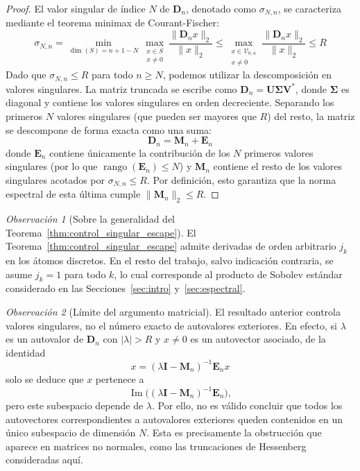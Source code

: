 \documentclass[12pt,a4paper]{article}
\theoremstyle{definition}
\theoremstyle{remark}
\newtheorem{remark}{Observación}
\begin{document}
\begin{proof}
  El valor singular de índice $N$ de $\mathbf{D}_n$, denotado como $\sigma_{N,n}$, se caracteriza mediante el teorema minimax de Courant-Fischer:
  \begin{equation}
    \sigma_{N,n} = \min_{\dim(S) = n+1-N} \max_{\substack{x \in S \\ x \neq 0}} \frac{\|\mathbf{D}_n x\|_2}{\|x\|_2} \le \max_{\substack{x \in \mathcal{V}_{0,n} \\ x \neq 0}} \frac{\|\mathbf{D}_n x\|_2}{\|x\|_2} \le R
  \end{equation}
  Dado que $\sigma_{N,n} \le R$ para todo $n \ge N$, podemos utilizar la descomposición en valores singulares. La matriz truncada se escribe como $\mathbf{D}_n = \mathbf{U} \mathbf{\Sigma} \mathbf{V}^*$, donde $\mathbf{\Sigma}$ es diagonal y contiene los valores singulares en orden decreciente.
  Separando los primeros $N$ valores singulares (que pueden ser mayores que $R$) del resto, la matriz se descompone de forma exacta como una suma:
  $$ \mathbf{D}_n = \mathbf{M}_n + \mathbf{E}_n $$
  donde $\mathbf{E}_n$ contiene únicamente la contribución de los $N$ primeros valores singulares (por lo que $\operatorname{rango}(\mathbf{E}_n) \le N$) y $\mathbf{M}_n$ contiene el resto de los valores singulares acotados por $\sigma_{N,n} \le R$. Por definición, esto garantiza que la norma espectral de esta última cumple $\|\mathbf{M}_n\|_2 \le R$.
\end{proof}

\begin{remark}[Sobre la generalidad del Teorema~\ref{thm:control_singular_escape}]
  El Teorema~\ref{thm:control_singular_escape} admite derivadas de orden arbitrario $j_k$ en los átomos discretos. En el resto del trabajo, salvo indicación contraria, se asume $j_k=1$ para todo $k$, lo cual corresponde al producto de Sobolev estándar considerado en las Secciones~\ref{sec:intro} y~\ref{sec:espectral}.
\end{remark}

\begin{remark}[Límite del argumento matricial]
  El resultado anterior controla valores singulares, no el número exacto de autovalores exteriores. En efecto, si $\lambda$ es un autovalor de $\mathbf{D}_n$ con $|\lambda| > R$ y $x \neq 0$ es un autovector asociado, de la identidad
  \begin{equation}\label{eq:autovector_escape}
    x = (\lambda \mathbf{I} - \mathbf{M}_n)^{-1} \mathbf{E}_n x
  \end{equation}
  solo se deduce que $x$ pertenece a
  \[
    \operatorname{Im}\bigl((\lambda \mathbf{I} - \mathbf{M}_n)^{-1} \mathbf{E}_n\bigr),
  \]
  pero este subespacio depende de $\lambda$. Por ello, no es válido concluir que todos los autovectores correspondientes a autovalores exteriores queden contenidos en un único subespacio de dimensión $N$. Esta es precisamente la obstrucción que aparece en matrices no normales, como las truncaciones de Hessenberg consideradas aquí.
\end{remark}
\end{document}
